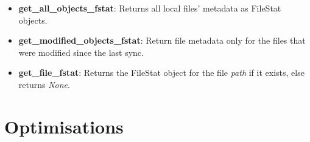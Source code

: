 \documentclass{beamer}
\begin{document}
\begin{tframe}
{\begin{figure}[!htpb]
      \end{figure}
      \small{
      \begin{itemize}
        \item \textbf{get\_all\_objects\_fstat}: Returns all local files' metadata as FileStat objects.
        \item \textbf{get\_modified\_objects\_fstat}: Return file metadata only for the files that were modified since the last sync.
        \item \textbf{get\_file\_fstat}: Returns the FileStat object for the file \emph{path} if it exists, else returns \emph{None}.
      \end{itemize}
      }
		}
	\end{tframe}

\section{Optimisations}
\end{document}
